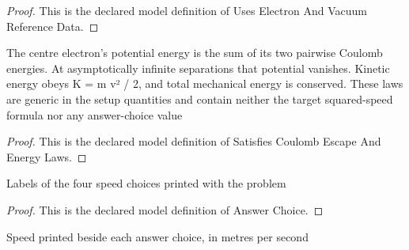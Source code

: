 \begin{proof}
  This is the declared model definition of Uses Electron And Vacuum Reference Data.
\end{proof}
\begin{definition}
  \label{def:physics:phyx-mini-0853:phyxminiproblems-problemphyxmini0853-satisfiescoulombescapeandenergylaws}
  The centre electron's potential energy is the sum of its two pairwise Coulomb energies. At asymptotically infinite separations that potential vanishes. Kinetic energy obeys K = m v² / 2, and total mechanical energy is conserved. These laws are generic in the setup quantities and contain neither the target squared-speed formula nor any answer-choice value
\end{definition}
\begin{proof}
  This is the declared model definition of Satisfies Coulomb Escape And Energy Laws.
\end{proof}
\begin{definition}
  \label{def:physics:phyx-mini-0853:phyxminiproblems-problemphyxmini0853-answerchoice}
  Labels of the four speed choices printed with the problem
\end{definition}
\begin{proof}
  This is the declared model definition of Answer Choice.
\end{proof}
\begin{definition}
  \label{def:physics:phyx-mini-0853:phyxminiproblems-problemphyxmini0853-displayedspeedinmeterspersecond}
  Speed printed beside each answer choice, in metres per second
\end{definition}
